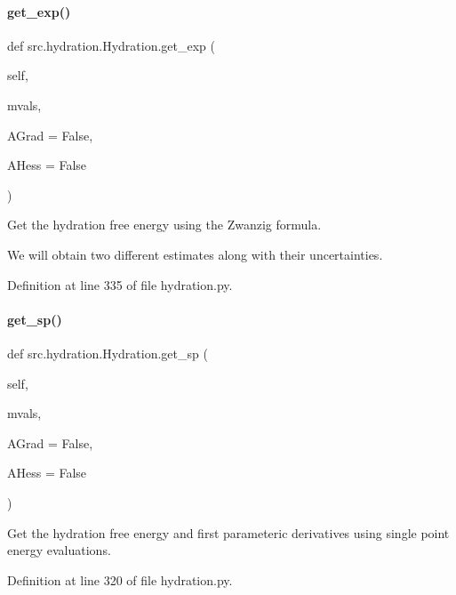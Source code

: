 \paragraph{\texorpdfstring{get\+\_\+exp()}{get\_exp()}}
{\footnotesize\ttfamily def src.\+hydration.\+Hydration.\+get\+\_\+exp (\begin{DoxyParamCaption}\item[{}]{self,  }\item[{}]{mvals,  }\item[{}]{A\+Grad = {\ttfamily False},  }\item[{}]{A\+Hess = {\ttfamily False} }\end{DoxyParamCaption})}



Get the hydration free energy using the Zwanzig formula. 

We will obtain two different estimates along with their uncertainties. 

Definition at line 335 of file hydration.\+py.

\mbox{\label{classsrc_1_1hydration_1_1Hydration_aedb0b81f516f946514ec4e1bc4c0f689}} 
\paragraph{\texorpdfstring{get\+\_\+sp()}{get\_sp()}}
{\footnotesize\ttfamily def src.\+hydration.\+Hydration.\+get\+\_\+sp (\begin{DoxyParamCaption}\item[{}]{self,  }\item[{}]{mvals,  }\item[{}]{A\+Grad = {\ttfamily False},  }\item[{}]{A\+Hess = {\ttfamily False} }\end{DoxyParamCaption})}



Get the hydration free energy and first parameteric derivatives using single point energy evaluations. 



Definition at line 320 of file hydration.\+py.

\mbox{\label{classsrc_1_1hydration_1_1Hydration_a38cd994b0a967cae32096b80c4e630a9}} 
